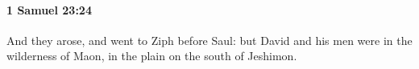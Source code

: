 
		\paragraph{1 Samuel 23:24} %
			\label{1SAMUEL-23-24}

			And they arose, and went to Ziph before Saul: but David and his men were in the wilderness of Maon, in the plain on the south of Jeshimon.


